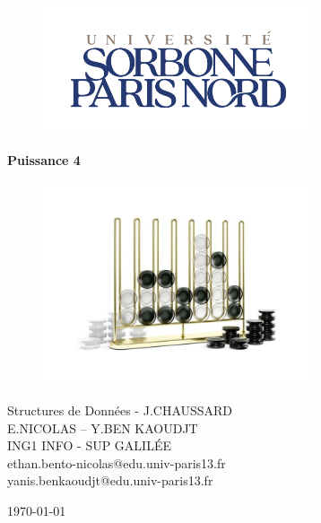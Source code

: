 \documentclass[a4paper,fleqn]{article}
\begin{document}


\pagecolor{color}
\thispagestyle{empty}

\begin{figure}
    \centering
    \includegraphics[width=8cm]{./uspn.png}
\end{figure}

\vspace{6cm}

\begin{center}
    {\huge \bfseries Puissance 4 \par}
    
    \vspace{1cm}
    
    \begin{figure}[h]
        \centering
        \includegraphics[width=8cm]{./cover.jpeg}
    \end{figure}
    
    \vspace{2cm}
    
    \large Structures de Données - J.CHAUSSARD \\
    
    \vspace{1cm}
    E.NICOLAS -- Y.BEN KAOUDJT\\
    \vspace{0.3cm}
    ING1 INFO - SUP GALILÉE \\
    \vspace{0.3cm}
    ethan.bento-nicolas@edu.univ-paris13.fr\\
    yanis.benkaoudjt@edu.univ-paris13.fr
    
    \vfill
   
    
    \today 
\end{center}
 
\end{document}
